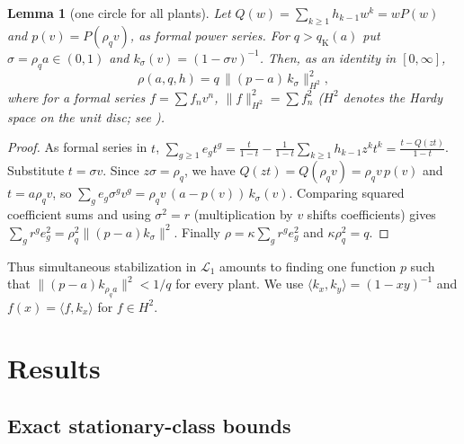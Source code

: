 \documentclass[preprint,12pt,numbers]{elsarticle}
\newtheorem{lemma}{Lemma}
\theoremstyle{definition}
\newcommand{\Lone}{\mathcal{L}_1}
\newcommand{\qK}{q_{\mathrm K}}
\begin{document}
\begin{lemma}[one circle for all plants]\label{lem:circle}
Let $Q(w)=\sum_{k\ge1}h_{k-1}w^k=wP(w)$ and $p(v)=P(\rho_qv)$, as formal power series. For $q>\qK(a)$ put $\sigma=\rho_qa\in(0,1)$ and $k_\sigma(v)=(1-\sigma v)^{-1}$. Then, as an identity in $[0,\infty]$,
\begin{equation}\label{eq:circle}
\rho(a,q,h)=q\,\bigl\|(p-a)\,k_\sigma\bigr\|_{H^2}^2,
\end{equation}
 where for a formal series $f=\sum f_nv^n$, $\|f\|_{H^2}^2=\sum f_n^2$ ($H^2$ denotes the Hardy space on the unit disc; see \citet{duren1970}).
\end{lemma}
\begin{proof}
As formal series in $t$, $\sum_{g\ge1}e_gt^g=\frac{t}{1-t}-\frac1{1-t}\sum_{k\ge1}h_{k-1}z^kt^k=\frac{t-Q(zt)}{1-t}$. Substitute $t=\sigma v$. Since $z\sigma=\rho_q$, we have $Q(zt)=Q(\rho_qv)=\rho_qv\,p(v)$ and $t=a\rho_qv$, so $\sum_ge_g\sigma^gv^g=\rho_q v\,(a-p(v))\,k_\sigma(v)$. Comparing squared coefficient sums and using $\sigma^2=r$ (multiplication by $v$ shifts coefficients) gives $\sum_gr^ge_g^2=\rho_q^2\|(p-a)k_\sigma\|^2$. Finally $\rho=\kappa\sum_gr^ge_g^2$ and $\kappa\rho_q^2=q$.
\end{proof}

Thus simultaneous stabilization in $\Lone$ amounts to finding one function $p$ such that $\|(p-a)k_{\rho_qa}\|^2<1/q$ for every plant. We use $\langle k_x,k_y\rangle=(1-xy)^{-1}$ and $f(x)=\langle f,k_x\rangle$ for $f\in H^2$.

\section{Results}
\subsection{Exact stationary-class bounds}\label{sec:main}
\end{document}
